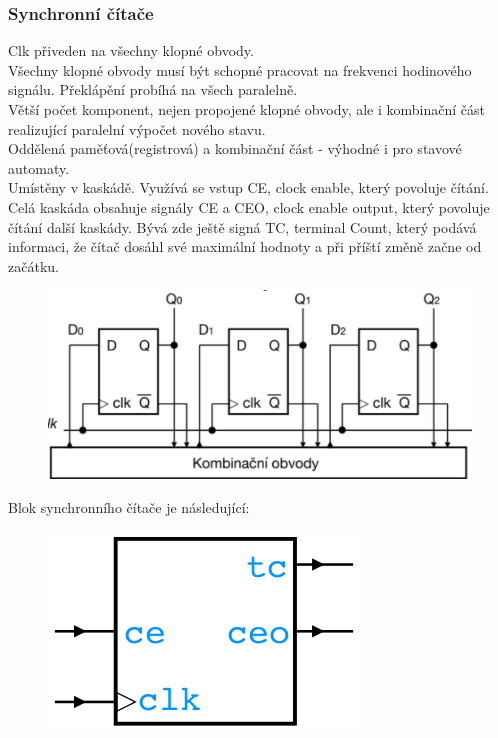 \subsubsection{Synchronní čítače}
Clk přiveden na všechny klopné obvody.\\
Všechny klopné obvody musí být schopné pracovat na frekvenci hodinového signálu. Překlápění probíhá na všech paralelně.\\
Větší počet komponent, nejen propojené klopné obvody, ale i kombinační část realizující paralelní výpočet nového stavu.\\
Oddělená paměťová(registrová) a kombinační část - výhodné i pro stavové automaty.\\
Umístěny v kaskádě. Využívá se vstup CE, clock enable, který povoluje čítání. Celá kaskáda obsahuje signály CE a CEO, clock enable output, který povoluje čítání další kaskády. Bývá zde ještě signá TC, terminal Count, který podává informaci, že čítač dosáhl své maximální hodnoty a při příští změně začne od začátku.\\
\begin{figure}[h!]
    \centering
    \includegraphics*[scale = 0.4]{img/SyncCit.png}
\end{figure}

Blok synchronního čítače je následující: \\
\begin{figure}[h!]
    \centering
    \includegraphics*[scale = 0.5]{img/Sync.png}
\end{figure}

